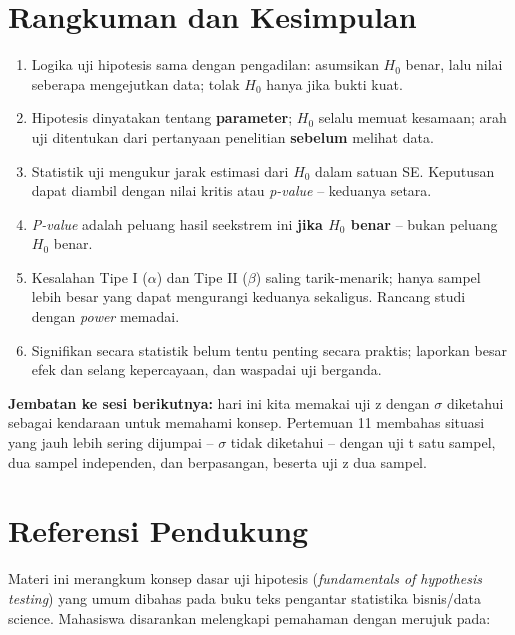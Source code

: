 \documentclass[
  indonesian,
  letterpaper,
]{book}
\providecommand{\tightlist}{%
  \setlength{\itemsep}{0pt}\setlength{\parskip}{0pt}}
\begin{document}
\section{Rangkuman dan Kesimpulan}\label{rangkuman-dan-kesimpulan-1}

\begin{enumerate}
\def\labelenumi{\arabic{enumi}.}
\tightlist
\item
  Logika uji hipotesis sama dengan pengadilan: asumsikan \(H_0\) benar,
  lalu nilai seberapa mengejutkan data; tolak \(H_0\) hanya jika bukti
  kuat.
\item
  Hipotesis dinyatakan tentang \textbf{parameter}; \(H_0\) selalu memuat
  kesamaan; arah uji ditentukan dari pertanyaan penelitian
  \textbf{sebelum} melihat data.
\item
  Statistik uji mengukur jarak estimasi dari \(H_0\) dalam satuan SE.
  Keputusan dapat diambil dengan nilai kritis atau \emph{p-value} --
  keduanya setara.
\item
  \emph{P-value} adalah peluang hasil seekstrem ini \textbf{jika \(H_0\)
  benar} -- bukan peluang \(H_0\) benar.
\item
  Kesalahan Tipe I (\(\alpha\)) dan Tipe II (\(\beta\)) saling
  tarik-menarik; hanya sampel lebih besar yang dapat mengurangi keduanya
  sekaligus. Rancang studi dengan \emph{power} memadai.
\item
  Signifikan secara statistik belum tentu penting secara praktis;
  laporkan besar efek dan selang kepercayaan, dan waspadai uji berganda.
\end{enumerate}

\textbf{Jembatan ke sesi berikutnya:} hari ini kita memakai uji z dengan
\(\sigma\) diketahui sebagai kendaraan untuk memahami konsep. Pertemuan
11 membahas situasi yang jauh lebih sering dijumpai -- \(\sigma\) tidak
diketahui -- dengan uji t satu sampel, dua sampel independen, dan
berpasangan, beserta uji z dua sampel.

\section{Referensi Pendukung}\label{referensi-pendukung-1}

Materi ini merangkum konsep dasar uji hipotesis (\emph{fundamentals of
hypothesis testing}) yang umum dibahas pada buku teks pengantar
statistika bisnis/data science. Mahasiswa disarankan melengkapi
pemahaman dengan merujuk pada:
\end{document}

